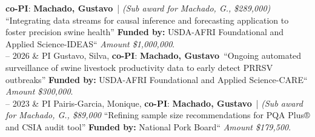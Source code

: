 \documentclass[11pt]{article}
\newcommand{\FirstName}{Gustavo}
\newcommand{\LastName}{Machado}
\newcommand{\Initials}{}
\newcommand{\Me}{\textbf{\LastName, \FirstName \Initials }}
\newcommand{\Duration}[2]{\fontsize{10pt}{0}\selectfont #1 -- #2}
\begin{document}
\begin{EntriesTable}
  \textbf{co-PI}: \Me\ | \emph{(Sub award for Machado, G., \$289,000)}
  ``Integrating data streams for causal inference and forecasting application to foster precision swine health'' \textbf {Funded by:}
  USDA-AFRI Foundational and Applied Science-IDEAS``
  \textit{Amount \$1,000,000}.
  \\
\Duration{2023}{2026}  & PI Gustavo, Silva,
  \textbf{co-PI}: \Me\ 
``Ongoing automated surveillance of swine livestock productivity data to early detect PRRSV outbreaks'' \textbf {Funded by:}
  USDA-AFRI Foundational and Applied Science-CARE``
  \textit{Amount \$300,000}.
  \\
\Duration{2022}{2023} & PI Pairis-Garcia, Monique,
  \textbf{co-PI}: \Me\ | \emph{(Sub award for Machado, G., \$89,000}
  ``Refining sample size recommendations for PQA Plus® and CSIA audit tool'' \textbf {Funded by:}
  National Pork Board``
  \textit{Amount \$179,500}.
\end{EntriesTable}
\end{document}
